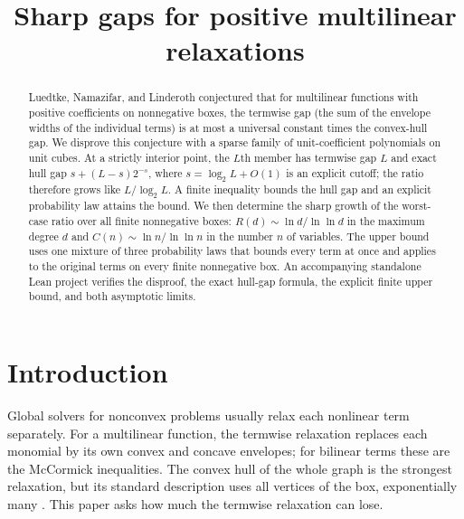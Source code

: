 \documentclass[11pt]{article}
\title{Sharp gaps for positive multilinear relaxations}
\author{}
\date{}
\theoremstyle{remark}
\begin{document}
\maketitle
\begin{abstract}
Luedtke, Namazifar, and Linderoth conjectured that for multilinear
functions with positive coefficients on nonnegative boxes, the termwise
gap (the sum of the envelope widths of the individual terms) is at most a
universal constant times the convex-hull gap. We disprove this conjecture
with a sparse family of unit-coefficient polynomials on unit cubes. At a
strictly interior point, the $L$th member has termwise gap $L$ and exact
hull gap $s+(L-s)2^{-s}$, where $s=\log_2L+O(1)$ is an explicit cutoff;
the ratio therefore grows like $L/\log_2L$. A finite inequality bounds the
hull gap and an explicit probability law attains the bound. We then
determine the sharp growth of the worst-case ratio over all finite
nonnegative boxes: $R(d)\sim\ln d/\ln\ln d$ in the maximum degree $d$ and
$C(n)\sim\ln n/\ln\ln n$ in the number $n$ of variables. The upper bound
uses one mixture of three probability laws that bounds every term at once
and applies to the original terms on every finite nonnegative box. An
accompanying standalone Lean project verifies the disproof, the exact
hull-gap formula, the explicit finite upper bound, and both asymptotic
limits.
\end{abstract}

\section{Introduction}\label{sec:intro}
Global solvers for nonconvex problems usually relax each nonlinear term
separately. For a multilinear function, the termwise relaxation replaces
each monomial by its own convex and concave envelopes; for bilinear terms
these are the McCormick inequalities. The convex hull of the whole graph
is the strongest relaxation, but its standard description uses all
vertices of the box, exponentially many \citep{Luedtke2012}. This paper
asks how much the termwise relaxation can lose.
\end{document}

